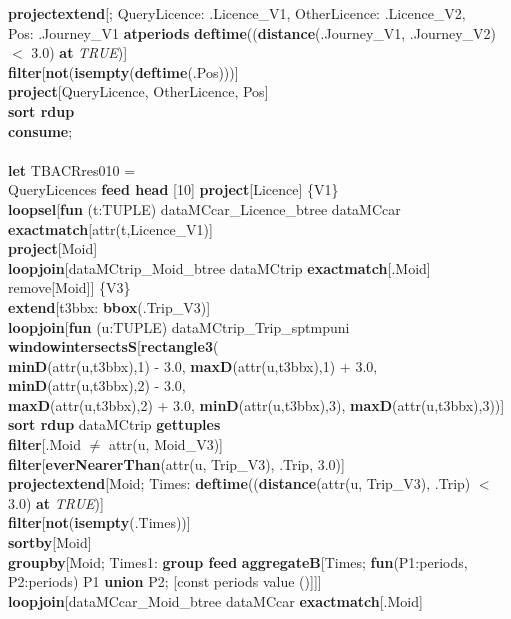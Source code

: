 \documentclass[a4paper]{article}
\newcommand{\op}[1]{\textbf{#1}}
\newcommand{\true}{\textsl{TRUE}}
\begin{document}
\begin{scriptsize}
\begin{tabbing}
\>\op{projectextend}[; QueryLicence: .Licence\_V1, OtherLicence: .Licence\_V2,\\
\>\>\>\>Pos: .Journey\_V1 \op{atperiods} \op{deftime}((\op{distance}(.Journey\_V1, .Journey\_V2) $<$ 3.0) \op{at} \true{})]\\
\>\op{filter}[\op{not}(\op{isempty}(\op{deftime}(.Pos)))]\\
\>\op{project}[QueryLicence, OtherLicence, Pos]\\
\>\op{sort rdup}\\
\op{consume};\\
\\
\op{let} TBACRres010 =\\
\>QueryLicences \op{feed head} [10] \op{project}[Licence] \{V1\}\\
\>\op{loopsel}[\op{fun} (t:TUPLE) dataMCcar\_Licence\_btree dataMCcar \op{exactmatch}[attr(t,Licence\_V1)]\\
\>\>\op{project}[Moid]\\
\>\>\op{loopjoin}[dataMCtrip\_Moid\_btree dataMCtrip \op{exactmatch}[.Moid] remove[Moid]] \{V3\}\\
\>\>\op{extend}[t3bbx: \op{bbox}(.Trip\_V3)]\\
\>\>\op{loopjoin}[\op{fun} (u:TUPLE) dataMCtrip\_Trip\_sptmpuni \op{windowintersectsS}[\op{rectangle3}(\\
\>\>\>\>\op{minD}(attr(u,t3bbx),1) - 3.0, \op{maxD}(attr(u,t3bbx),1) + 3.0, \op{minD}(attr(u,t3bbx),2) - 3.0,\\
\>\>\>\>\op{maxD}(attr(u,t3bbx),2) + 3.0, \op{minD}(attr(u,t3bbx),3), \op{maxD}(attr(u,t3bbx),3))]\\
\>\>\>\op{sort rdup} dataMCtrip \op{gettuples}\\
\>\>\>\op{filter}[.Moid $\neq$ attr(u, Moid\_V3)]\\
\>\>\>\op{filter}[\op{everNearerThan}(attr(u, Trip\_V3), .Trip, 3.0)]\\
\>\>\>\op{projectextend}[Moid; Times: \op{deftime}((\op{distance}(attr(u, Trip\_V3), .Trip) $<$ 3.0) \op{at} \true{})]\\
\>\>\>\op{filter}[\op{not}(\op{isempty}(.Times))]\\
\>\>\>\op{sortby}[Moid]\\
\>\>\>\op{groupby}[Moid; Times1: \op{group feed}
\>\>\>\>\>\op{aggregateB}[Times; \op{fun}(P1:periods, P2:periods) P1 \op{union} P2; [const periods value ()]]]\\
\>\>\>\op{loopjoin}[dataMCcar\_Moid\_btree dataMCcar \op{exactmatch}[.Moid]\\

\end{tabbing}
\end{scriptsize}
\end{document}
